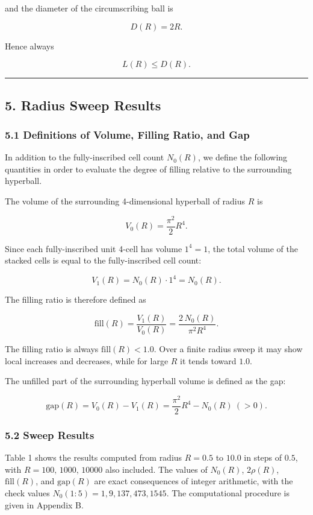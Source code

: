 \documentclass[
]{article}
\begin{document}
and the diameter of the circumscribing ball is

\[
D(R)=2R .
\]

Hence always

\[
L(R)\le D(R) .
\]

\begin{center}\rule{0.5\linewidth}{0.5pt}\end{center}

\subsection{5. Radius Sweep Results}\label{radius-sweep-results}

\subsubsection{5.1 Definitions of Volume, Filling Ratio, and
Gap}\label{definitions-of-volume-filling-ratio-and-gap}

In addition to the fully-inscribed cell count \(N_0(R)\), we define the
following quantities in order to evaluate the degree of filling relative
to the surrounding hyperball.

The volume of the surrounding 4-dimensional hyperball of radius \(R\) is

\[
V_0(R)=\frac{\pi^2}{2}R^4 .
\]

Since each fully-inscribed unit 4-cell has volume \(1^4=1\), the total
volume of the stacked cells is equal to the fully-inscribed cell count:

\[
V_1(R)=N_0(R)\cdot 1^4=N_0(R) .
\]

The filling ratio is therefore defined as

\[
\mathrm{fill}(R)=\frac{V_1(R)}{V_0(R)}=\frac{2\,N_0(R)}{\pi^2 R^4}.
\]

The filling ratio is always \(\mathrm{fill}(R)<1.0\). Over a finite
radius sweep it may show local increases and decreases, while for large
\(R\) it tends toward \(1.0\).

The unfilled part of the surrounding hyperball volume is defined as the
gap:

\[
\mathrm{gap}(R)=V_0(R)-V_1(R)=\frac{\pi^2}{2}R^4-N_0(R)\ (>0).
\]

\subsubsection{5.2 Sweep Results}\label{sweep-results}

Table 1 shows the results computed from radius \(R=0.5\) to \(10.0\) in
steps of \(0.5\), with \(R=100,\,1000,\,10000\) also included. The
values of \(N_0(R)\), \(2\rho(R)\), \(\mathrm{fill}(R)\), and
\(\mathrm{gap}(R)\) are exact consequences of integer arithmetic, with
the check values \(N_0(1{:}5)=1,9,137,473,1545\). The computational
procedure is given in Appendix B.
\end{document}
